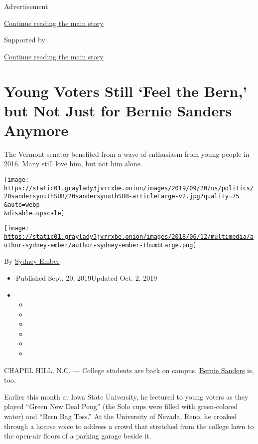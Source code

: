 Advertisement

\protect\hyperlink{after-top}{Continue reading the main story}

Supported by

\protect\hyperlink{after-sponsor}{Continue reading the main story}

\hypertarget{young-voters-still-feel-the-bern-but-not-just-for-bernie-sanders-anymore}{%
\section{Young Voters Still `Feel the Bern,' but Not Just for Bernie
Sanders
Anymore}\label{young-voters-still-feel-the-bern-but-not-just-for-bernie-sanders-anymore}}

The Vermont senator benefited from a wave of enthusiasm from young
people in 2016. Many still love him, but not him alone.

\texttt{[image: https://static01.graylady3jvrrxbe.onion/images/2019/09/20/us/politics/20sandersyouthSUB/20sandersyouthSUB-articleLarge-v2.jpg?quality=75\\\&auto=webp\\\&disable=upscale]}

\href{https://www.nytimes3xbfgragh.onion/by/sydney-ember}{\texttt{[image: https://static01.graylady3jvrrxbe.onion/images/2018/06/12/multimedia/author-sydney-ember/author-sydney-ember-thumbLarge.png]}}

By \href{https://www.nytimes3xbfgragh.onion/by/sydney-ember}{Sydney
Ember}

\begin{itemize}
\item
  Published Sept. 20, 2019Updated Oct. 2, 2019
\item
  \begin{itemize}
  \item
  \item
  \item
  \item
  \item
  \item
  \end{itemize}
\end{itemize}

CHAPEL HILL, N.C. --- College students are back on campus.
\href{https://www.nytimes3xbfgragh.onion/interactive/2020/us/elections/bernie-sanders.html}{Bernie
Sanders} is, too.

Earlier this month at Iowa State University, he lectured to young voters
as they played ``Green New Deal Pong'' (the Solo cups were filled with
green-colored water) and ``Bern Bag Toss.'' At the University of Nevada,
Reno, he croaked through a hoarse voice to address a crowd that
stretched from the college lawn to the open-air floors of a parking
garage beside it.

